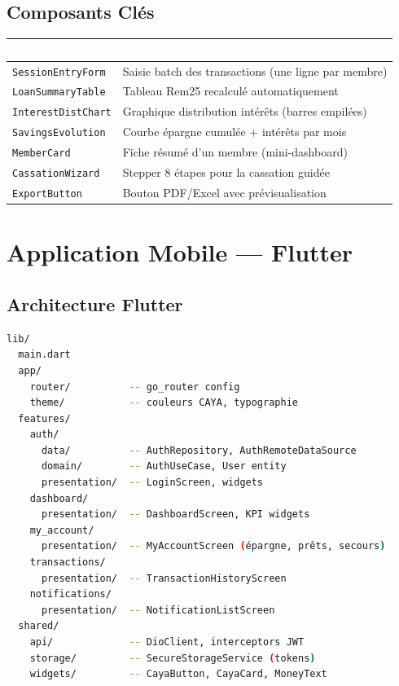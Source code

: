 \documentclass[12pt, a4paper]{report}
\begin{document}
\subsection{Composants Clés}

\begin{center}
\begin{tabular}{L{4cm}L{9cm}}
  \toprule
  \textcolor{white}{\textbf{Composant}} &
  \textcolor{white}{\textbf{Rôle}} \\
  \midrule
  \texttt{SessionEntryForm}   & Saisie batch des transactions (une ligne par membre) \\
  \texttt{LoanSummaryTable}   & Tableau Rem25 recalculé automatiquement \\
  \texttt{InterestDistChart}  & Graphique distribution intérêts (barres empilées) \\
  \texttt{SavingsEvolution}   & Courbe épargne cumulée + intérêts par mois \\
  \texttt{MemberCard}         & Fiche résumé d'un membre (mini-dashboard) \\
  \texttt{CassationWizard}    & Stepper 8 étapes pour la cassation guidée \\
  \texttt{ExportButton}       & Bouton PDF/Excel avec prévisualisation \\
  \bottomrule
\end{tabular}
\end{center}

\section{Application Mobile — Flutter}

\subsection{Architecture Flutter}

\begin{lstlisting}[language=bash, caption={Arborescence Flutter}]
lib/
  main.dart
  app/
    router/          -- go_router config
    theme/           -- couleurs CAYA, typographie
  features/
    auth/
      data/          -- AuthRepository, AuthRemoteDataSource
      domain/        -- AuthUseCase, User entity
      presentation/  -- LoginScreen, widgets
    dashboard/
      presentation/  -- DashboardScreen, KPI widgets
    my_account/
      presentation/  -- MyAccountScreen (épargne, prêts, secours)
    transactions/
      presentation/  -- TransactionHistoryScreen
    notifications/
      presentation/  -- NotificationListScreen
  shared/
    api/             -- DioClient, interceptors JWT
    storage/         -- SecureStorageService (tokens)
    widgets/         -- CayaButton, CayaCard, MoneyText
\end{lstlisting}
\end{document}

